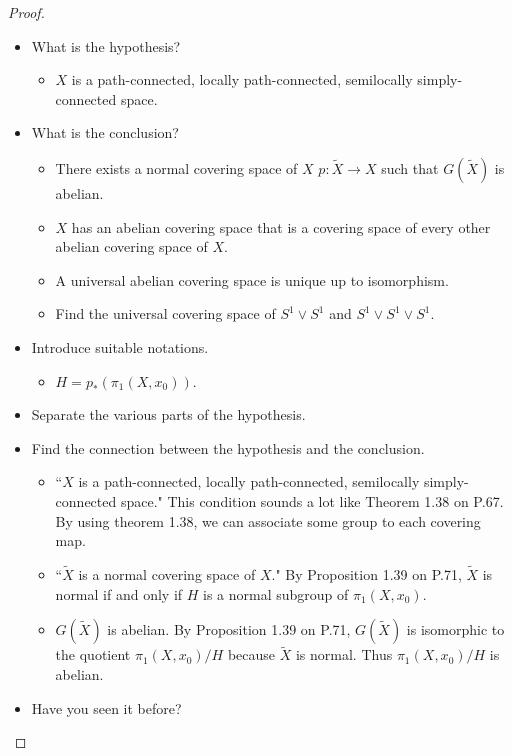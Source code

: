 \documentclass[12pt, psamsfonts]{amsart}
\theoremstyle{definition}
\theoremstyle{remark}
\numberwithin{equation}{section}
\begin{document}
\begin{proof}
$ $
\begin{itemize}
  \item
    What is the hypothesis?
    \begin{itemize}
      \item $X$ is a path-connected, locally path-connected, semilocally simply-connected space.
    \end{itemize}
  \item What is the conclusion?
    \begin{itemize}
      \item There exists a normal covering space of $X$ $p: \tilde{X} \rightarrow X$ such that $G(\tilde{X})$ is abelian.
      \item $X$ has an abelian covering space that is a covering space of every other abelian covering space of $X$.
      \item A universal abelian covering space is unique up to isomorphism.
      \item Find the universal covering space of $S^1 \vee S^1$ and $S^1 \vee S^1 \vee S^1$.
    \end{itemize}
  \item
    Introduce suitable notations.
    \begin{itemize}
      \item $H = p_*(\pi_1(X, x_0))$.
    \end{itemize}
  \item Separate the various parts of the hypothesis.
  \item Find the connection between the hypothesis and the conclusion.
    \begin{itemize}
      \item
        ``$X$ is a path-connected, locally path-connected, semilocally simply-connected space."
        This condition sounds a lot like Theorem 1.38 on P.67.
        By using theorem 1.38, we can associate some group to each covering map.
      \item
        ``$\tilde{X}$ is a normal covering space of $X$."
        By Proposition 1.39 on P.71, $\tilde{X}$ is normal if and only if $H$ is a normal subgroup of $\pi_1(X, x_0)$.
      \item
        $G(\tilde{X})$ is abelian.
        By Proposition 1.39 on P.71, $G(\tilde{X})$ is isomorphic to the quotient $\pi_1(X, x_0) / H$ because $\tilde{X}$ is normal.
        Thus $\pi_1(X, x_0) / H$ is abelian.
    \end{itemize}
  \item Have you seen it before?

\end{itemize}
\end{proof}
\end{document}
